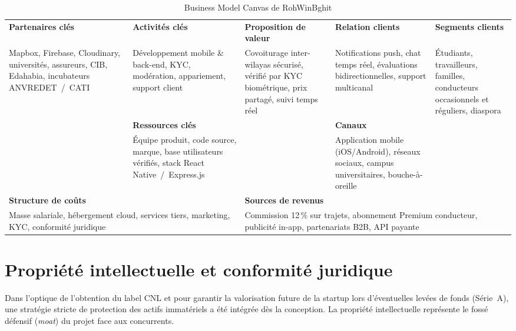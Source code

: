 \documentclass[12pt, a4paper, oneside]{report}
\begin{document}
\begin{table}[H]
\centering
\footnotesize
\renewcommand{\arraystretch}{1.3}
\begin{tabularx}{\textwidth}{|X|X|X|X|X|}
\hline
\cellcolor{rohlight}\textbf{Partenaires clés} &
\cellcolor{rohlight}\textbf{Activités clés} &
\cellcolor{rohlight}\textbf{Proposition de valeur} &
\cellcolor{rohlight}\textbf{Relation clients} &
\cellcolor{rohlight}\textbf{Segments clients} \\
\small Mapbox, Firebase, Cloudinary, universités, assureurs, CIB, Edahabia, incubateurs ANVREDET~/~CATI &
\small Développement mobile \& back-end, KYC, modération, appariement, support client &
\small Covoiturage inter-wilayas sécurisé, vérifié par KYC biométrique, prix partagé, suivi temps réel &
\small Notifications push, chat temps réel, évaluations bidirectionnelles, support multicanal &
\small Étudiants, travailleurs, familles, conducteurs occasionnels et réguliers, diaspora \\
\hline
 &
\cellcolor{rohlight}\textbf{Ressources clés} &
 &
\cellcolor{rohlight}\textbf{Canaux} &
 \\
 &
\small Équipe produit, code source, marque, base utilisateurs vérifiés, stack React Native~/~Express.js &
 &
\small Application mobile (iOS/Android), réseaux sociaux, campus universitaires, bouche-à-oreille &
 \\
\hline
\multicolumn{2}{|p{0.39\linewidth}|}{\cellcolor{rohlight}\textbf{Structure de coûts}} &
\multicolumn{3}{p{0.59\linewidth}|}{\cellcolor{rohlight}\textbf{Sources de revenus}} \\
\multicolumn{2}{|p{0.39\linewidth}|}{\small Masse salariale, hébergement cloud, services tiers, marketing, KYC, conformité juridique} &
\multicolumn{3}{p{0.59\linewidth}|}{\small Commission 12\,\% sur trajets, abonnement Premium conducteur, publicité in-app, partenariats B2B, API payante} \\
\hline
\end{tabularx}
  \caption{Business Model Canvas de RohWinBghit}
\end{table}

\section{Propriété intellectuelle et conformité juridique}

Dans l'optique de l'obtention du label CNL et pour garantir la valorisation future de la startup lors d'éventuelles levées de fonds (Série~A), une stratégie stricte de protection des actifs immatériels a été intégrée dès la conception. La propriété intellectuelle représente le fossé défensif (\textit{moat}) du projet face aux concurrents.
\end{document}
